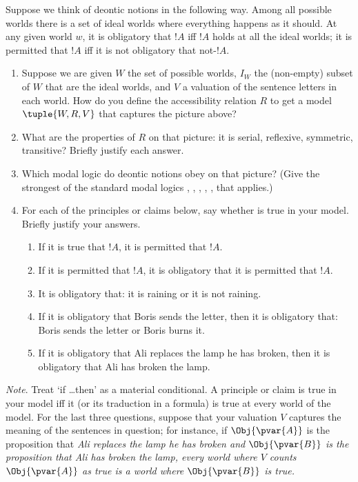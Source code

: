 \documentclass[../../../../include/open-logic-section]{subfiles}
\begin{document}
\begin{prob}
Suppose we think of deontic notions in the following way. Among all
possible worlds there is a set of ideal worlds where everything happens
as it should. At any given world $w$, it is obligatory that $!A$
iff $!A$ holds at all the ideal worlds; it is permitted that $!A$
iff it is not obligatory that not-$!A$. 

\begin{enumerate}
	\item Suppose we are given $W$ the set of possible worlds, $I_{W}$ the
	(non-empty) subset of $W$ that are the ideal worlds, and $V$ a valuation
	of the sentence letters in each world. How do you define the accessibility
	relation $R$ to get a model $\tuple{W,R,V}$ that captures
	the picture above? 
	\item What are the properties of $R$ on that picture: it is serial, reflexive,
	symmetric, transitive? Briefly justify each answer. 
	\item Which modal logic do deontic notions obey on that picture? (Give the
	strongest of the standard modal logics , ,
	, , ,  that applies.) 
	\item For each of the principles or claims below, say whether is true in
	your model. Briefly justify your answers.
		\begin{enumerate}
			\item If it is true that $!A$, it is permitted that $!A$.
			\item If it is permitted that $!A$, it is obligatory that it is permitted
			that $!A$.
			\item It is obligatory that: it is raining or it is not raining.
			\item If it is obligatory that Boris sends the letter, then it is obligatory
			that: Boris sends the letter or Boris burns it. 
			\item If it is obligatory that Ali replaces the lamp he has broken, then
			it is obligatory that Ali has broken the lamp.
		\end{enumerate}
\end{enumerate}
\emph{Note}. Treat `if \ldots then' as a material conditional. A
principle or claim is true in your model iff it (or its traduction
in a formula) is true at every world of the model. For the last three
questions, suppose that your valuation $V$ captures the meaning of
the sentences in question; for instance, if $\Obj{\pvar{A}}$ is the proposition
that \emph{Ali replaces the lamp he has broken and $\Obj{\pvar{B}}$ is the proposition
that \emph{Ali has broken the lamp}, every world where $V$ counts
$\Obj{\pvar{A}}$ as true is a world where $\Obj{\pvar{B}}$ is true.}
\end{prob}
\end{document}
